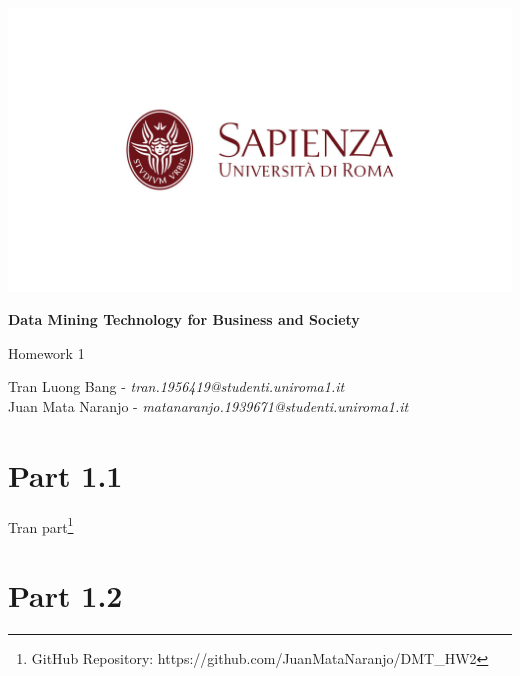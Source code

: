 \documentclass[10pt]{article}
\begin{document}
\begin{titlepage}
    \begin{center}
            
        \begin{center}
        \includegraphics[width=1.1\textwidth]{sapienza.png}
        \end{center}        
    
        \vspace{0.8cm}

        \Huge
        \textbf{Data Mining Technology for Business and Society}
            
        \vspace{0.5cm}
        \LARGE
        Homework 1
            
        \vspace{1.5cm}
            
        Tran Luong Bang -  \textit{tran.1956419@studenti.uniroma1.it} \\ Juan Mata Naranjo - \textit{matanaranjo.1939671@studenti.uniroma1.it}
            
    \end{center}
\end{titlepage}


\section{Part 1.1}

Tran part\footnote{GitHub Repository: https://github.com/JuanMataNaranjo/DMT\_HW2}

\newpage

\section{Part 1.2}
\end{document}
